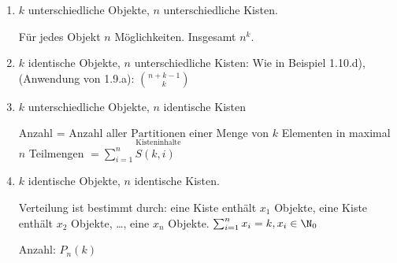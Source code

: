 \begin{enumerate}
	\item
	$k$ unterschiedliche Objekte, $n$ unterschiedliche Kisten. 
	
	Für jedes Objekt $n$ Möglichkeiten. Insgesamt $n^k$.
	
	\item
	$k$ identische Objekte, $n$ unterschiedliche Kisten:
	Wie in Beispiel 1.10.d), %
	(Anwendung von 1.9.a): %
	$\binom{n+k-1}{k}$	
	
	\item
	$k$ unterschiedliche Objekte, $n$ identische Kisten 
	
	Anzahl = Anzahl aller $\underset{\text{Kisteninhalte}}{\text{Partitionen}}$ %
	 einer Menge von $k$ Elementen in maximal $n$ Teilmengen
	 $= \sum_{i=1}^nS(k, i)$
	 
	 \item
	 $k$ identische Objekte, $n$ identische Kisten. 
	 
	 Verteilung ist bestimmt durch: eine Kiste enthält $x_1$ Objekte, eine Kiste enthält $x_2$ Objekte, \dots, eine $x_n$ Objekte.
	 $\sum_{i=1}^{n}x_i=k, x_i \in \N_0$
	 
	 Anzahl: $P_n(k)$
	  
	 
	
	
	
	
	
	
	
	
	
	
	
	
	
	
	
	
	
	
\end{enumerate}











